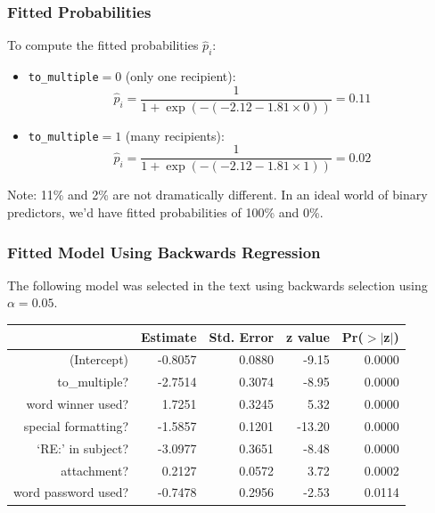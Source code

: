 \documentclass[handout]{beamer}
\begin{document}
\begin{frame}[fragile]
\frametitle{Fitted Probabilities}
%
%
To compute the fitted probabilities $\widehat{p}_i$:
\begin{itemize}
\item {\tt to\_multiple}$ = 0$ (only one recipient):
\[
\widehat{p}_i = \frac{1}{1 + \exp(-(-2.12 - 1.81 \times 0))} = 0.11
\]
\item {\tt to\_multiple}$ = 1$ (many recipients):
\[
\widehat{p}_i = \frac{1}{1 + \exp(-(-2.12 - 1.81 \times 1))} = 0.02
\]
\end{itemize}
\pause
Note:  11\% and 2\% are not dramatically different.  In an ideal world of binary predictors, we'd have fitted probabilities of 100\% and 0\%.
\end{frame}


\begin{frame}[fragile]
\frametitle{Fitted Model Using Backwards Regression}
The following model was selected in the text using backwards selection using $\alpha=0.05$.

\begin{table}[ht]
\centering
\begin{tabular}{r|rrrr}
  \hline
 & Estimate & Std. Error & z value & Pr($>$$|$z$|$) \\ 
  \hline
(Intercept) & -0.8057 & 0.0880 & -9.15 & 0.0000 \\ 
  to\_multiple? & -2.7514 & 0.3074 & -8.95 & 0.0000 \\ 
  word winner used? & 1.7251 & 0.3245 & 5.32 & 0.0000 \\ 
  special formatting? & -1.5857 & 0.1201 & -13.20 & 0.0000 \\ 
  `RE:' in subject? & -3.0977 & 0.3651 & -8.48 & 0.0000 \\ 
  attachment? & 0.2127 & 0.0572 & 3.72 & 0.0002 \\ 
  word password used? & -0.7478 & 0.2956 & -2.53 & 0.0114 \\ 
   \hline
\end{tabular}
\end{table} 

\end{frame}
\end{document}
